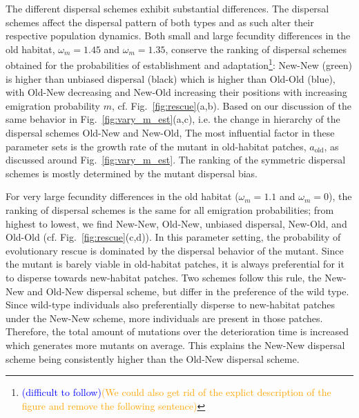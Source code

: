 \documentclass[a4paper,11pt]{article}
\newcommand{\francois}[1]{\textcolor{blue}{(#1)}}
\newcommand{\pete}[1]{\textcolor{orange}{(#1)}}
\newcommand{\chg}[1]{\textcolor{change}{#1}}
\begin{document}
The different dispersal schemes exhibit substantial differences. The dispersal schemes affect the dispersal pattern of both types and as such alter their respective population dynamics. Both small and large fecundity differences in the old habitat, $\omega_m=1.45$ and $\omega_m=1.35$, conserve the ranking of dispersal schemes obtained for the probabilities of establishment and adaptation\footnote{\francois{difficult to follow}\pete{We could also get rid of the explict description of the figure and remove the following sentence}}: \chg{New-New (green) is higher than unbiased dispersal (black) which is higher than Old-Old (blue), with Old-New decreasing and New-Old increasing their positions with increasing emigration probability $m$}, cf. Fig.~\ref{fig:rescue}(a,b). Based on our discussion of the same behavior in Fig.~\ref{fig:vary_m_est}(a,c), \chg{i.e. the change in hierarchy of the dispersal schemes Old-New and New-Old,} The most influential factor in these parameter sets is the growth rate of the mutant in old-habitat patches, $a_{\text{old}}$, \chg{as discussed around Fig.~\ref{fig:vary_m_est}.} \chg{The ranking of the symmetric dispersal schemes is mostly determined by the mutant dispersal bias.}

For very large fecundity differences in the old habitat ($\omega_m = 1.1$ and $\omega_m=0$), the ranking of dispersal schemes is the same for all emigration probabilities; from highest to lowest, we find \chg{New-New, Old-New, unbiased dispersal, New-Old, and Old-Old} (cf. Fig.~\ref{fig:rescue}(c,d)). In this parameter setting, the probability of evolutionary rescue is dominated by the dispersal behavior of the mutant. Since the mutant is barely viable in old-habitat patches, it is always preferential for it to disperse towards new-habitat patches. Two schemes follow this rule, \chg{the New-New and Old-New dispersal scheme}, but differ in the preference of the wild type. 
Since wild-type individuals also preferentially disperse to new-habitat patches under \chg{the New-New scheme}, more individuals are present in those patches. Therefore, the total amount of mutations over the deterioration time is increased which generates more mutants on average. This explains the New-New dispersal scheme being consistently higher than the Old-New dispersal scheme.
\end{document}
